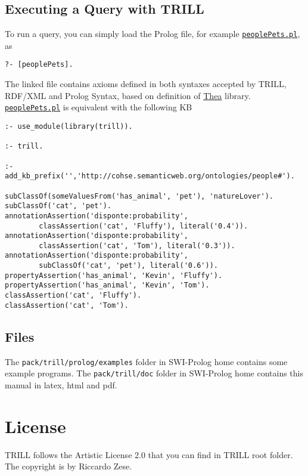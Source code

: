 \documentclass[a4paper,10pt]{scrartcl}
\begin{document}
\subsection{Executing a Query with TRILL}
To run a query, you can simply load the Prolog file, for example \href{http://trill.lamping.unife.it/example/trill/peoplePets.pl}{\texttt{peoplePets.pl}}, as
\begin{verbatim}
?- [peoplePets].
\end{verbatim}
\noindent
The linked file contains axioms defined in both syntaxes accepted by TRILL, RDF/XML and Prolog Syntax, based on definition of \href{http://vangelisv.github.io/thea/}{Thea} library.
\href{http://trill.lamping.unife.it/example/trill/peoplePets.pl}{\texttt{peoplePets.pl}} is equivalent with the following KB
\begin{verbatim}
:- use_module(library(trill)).

:- trill.

:- add_kb_prefix('','http://cohse.semanticweb.org/ontologies/people#').

subClassOf(someValuesFrom('has_animal', 'pet'), 'natureLover').
subClassOf('cat', 'pet').
annotationAssertion('disponte:probability', 
        classAssertion('cat', 'Fluffy'), literal('0.4')).
annotationAssertion('disponte:probability', 
        classAssertion('cat', 'Tom'), literal('0.3')).
annotationAssertion('disponte:probability', 
        subClassOf('cat', 'pet'), literal('0.6')).
propertyAssertion('has_animal', 'Kevin', 'Fluffy').
propertyAssertion('has_animal', 'Kevin', 'Tom').
classAssertion('cat', 'Fluffy').
classAssertion('cat', 'Tom').
\end{verbatim}
\noindent




\subsection{Files}
The \texttt{pack/trill/prolog/examples} folder in SWI-Prolog home contains some example programs.
The \texttt{pack/trill/doc} folder in SWI-Prolog home contains this manual in latex, html and pdf.


\section{License}
\label{license}



TRILL follows the Artistic License 2.0 that you can find in TRILL root folder. The copyright is by Riccardo Zese.
\vspace{3mm}
\end{document}
